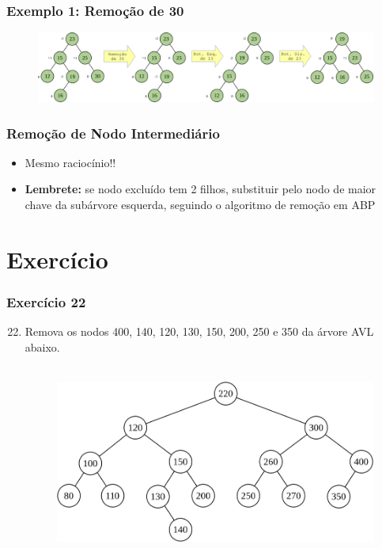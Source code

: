 \documentclass[aspectratio=169]{beamer}
\begin{document}
\begin{frame}\frametitle{Exemplo 1: Remoção de 30}
\begin{figure}[h]
	\centering
	\includegraphics[height=0.35\paperheight]{imagens/avl_rem_30.png}
\end{figure}
\end{frame}

\begin{frame}\frametitle{Remoção de Nodo Intermediário}
\begin{itemize}
	\item Mesmo raciocínio!!
	\item \textbf{Lembrete:} se nodo excluído tem 2 filhos, substituir pelo nodo de maior chave da subárvore esquerda, seguindo o algoritmo de remoção em ABP
\end{itemize}
\end{frame}

\section{Exercício}

\begin{frame}[fragile]\frametitle{Exercício 22}
\begin{enumerate}
	\setcounter{enumi}{21}
	\item Remova os nodos 400, 140, 120, 130, 150, 200, 250 e 350 da árvore AVL abaixo.\\~\\
\begin{figure}[h]
	\centering
	\includegraphics[height=0.55\paperheight]{imagens/avl-exercicio22.png}
\end{figure}
\end{enumerate}
\end{frame}
\end{document}
